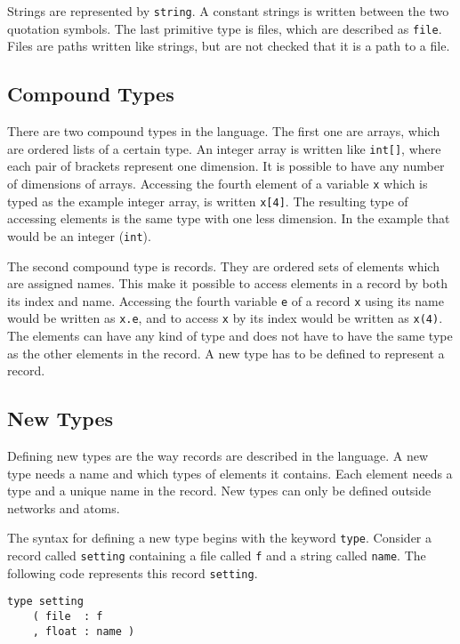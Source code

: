 Strings are represented by \verb#string#. A constant strings is
written between the two quotation symbols. The last primitive type is
files, which are described as \verb#file#. Files are paths written
like strings, but are not checked that it is a path to a file.


\subsection{Compound Types}\label{sec:compound}
There are two compound types in the language. The first one are
arrays, which are ordered lists of a certain type. An integer array is
written like \verb#int[]#, where each pair of brackets represent one
dimension. It is possible to have any number of dimensions of
arrays. Accessing the fourth element of a variable \verb#x# which is
typed as the example integer array, is written \verb#x[4]#. The
resulting type of accessing elements is the same type with one less
dimension. In the example that would be an integer (\verb#int#).

The second compound type is records. They are ordered sets of elements
which are assigned names. This make it possible to access elements in
a record by both its index and name. Accessing the fourth variable
\verb#e# of a record \verb#x# using its name would be written as
\verb#x.e#, and to access \verb#x# by its index would be written as
\verb#x(4)#. The elements can have any kind of type and does not have
to have the same type as the other elements in the record. A new type
has to be defined to represent a record.


\subsection{New Types}
Defining new types are the way records are described in the
language. A new type needs a name and which types of elements it
contains. Each element needs a type and a unique name in the
record. New types can only be defined outside networks and atoms.

The syntax for defining a new type begins with the keyword
\verb#type#. Consider a record called \verb#setting# containing a file
called \verb#f# and a string called \verb#name#. The following code
represents this record \verb#setting#.

\begin{verbatim}
type setting
    ( file  : f
    , float : name )
\end{verbatim}

